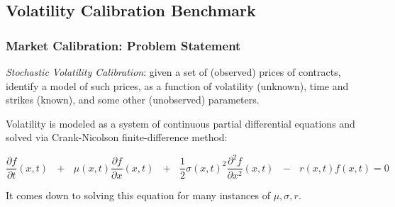 \documentclass{beamer}
\newcommand{\emp}[1]{\textcolor{DikuRed}{ #1}}
\begin{document}

\subsection{Volatility Calibration Benchmark}

\begin{frame}[fragile]
	\tableofcontents[currentsubsection]
\end{frame}

\begin{frame}[fragile,t]
\frametitle{Market Calibration: Problem Statement}

\emp{\em Stochastic Volatility Calibration}: given a set of (observed) 
prices of contracts, identify a model of such prices, as
a function of volatility (unknown), time and strikes (known),
and some other (unobserved) parameters.

\bigskip

Volatility is modeled as a system of continuous partial differential
equations and solved via Crank-Nicolson finite-difference method:


\begin{equation}
\frac{\partial f}{\partial t}(x,t)\mbox{ }+\mbox{ }\mu(x,t)\frac{\partial f}{\partial x}(x,t)\mbox{ }+\mbox{ }
\frac{1}{2}\sigma(x,t)^{2}\frac{\partial^{2} f}{\partial x^{2}}(x,t)\mbox{ }-\mbox{ }
r(x,t)f(x,t) = 0
\end{equation}

\bigskip

\emp{It comes down to solving this equation for many instances of $\mu, \sigma, r$.}

\end{frame}
\end{document}
